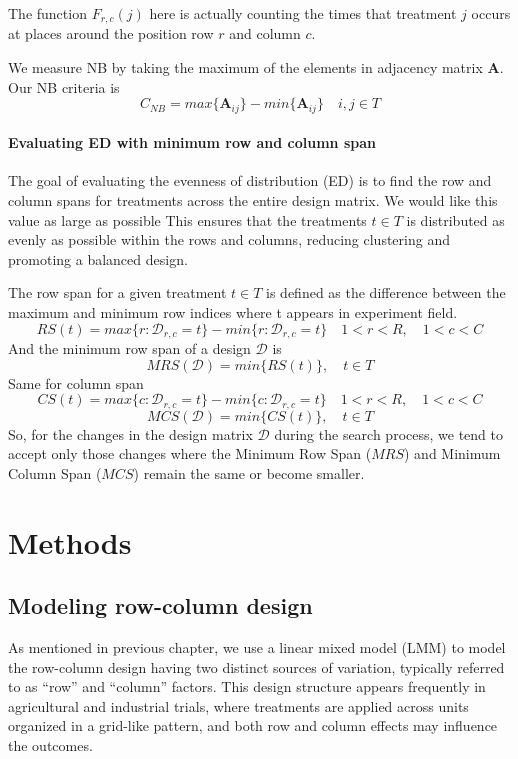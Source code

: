 \documentclass[
  a4paper,
  oneside,
  openany,
  12pt,
  onecolumn]{book}
\theoremstyle{plain}
\theoremstyle{definition}
\theoremstyle{remark}
\begin{document}
The function \(F_{r,c}(j)\) here is actually counting the times that
treatment \(j\) occurs at places around the position row \(r\) and
column \(c\).

We measure NB by taking the maximum of the elements in adjacency matrix
\(\boldsymbol{A}\). Our NB criteria is \[
C_{NB}=max\{\boldsymbol{A}_{ij}\}-min\{\boldsymbol{A}_{ij}\}  \quad i,j\in T
\]

\subsubsection{Evaluating ED with minimum row and column
span}\label{evaluating-ed-with-minimum-row-and-column-span}

The goal of evaluating the evenness of distribution (ED) is to find the
row and column spans for treatments across the entire design matrix. We
would like this value as large as possible This ensures that the
treatments \(t\in T\) is distributed as evenly as possible within the
rows and columns, reducing clustering and promoting a balanced design.

The row span for a given treatment \(t \in T\) is defined as the
difference between the maximum and minimum row indices where t appears
in experiment field. \[
RS(t)=max\{r:\mathcal{D}_{r,c}=t\}-min\{r:\mathcal{D}_{r,c}=t\} \quad 1<r<R,\quad 1<c<C
\] And the minimum row span of a design \(\mathcal{D}\) is \[
MRS(\mathcal{D})=min\{RS(t)\},\quad t \in T
\] Same for column span \[
CS(t)=max\{c:\mathcal{D}_{r,c}=t\}-min\{c:\mathcal{D}_{r,c}=t\} \quad 1<r<R,\quad 1<c<C
\] \[
MCS(\mathcal{D})=min\{CS(t)\},\quad t \in T
\] So, for the changes in the design matrix \(\mathcal{D}\) during the
search process, we tend to accept only those changes where the Minimum
Row Span (\(MRS\)) and Minimum Column Span (\(MCS\)) remain the same or
become smaller.


\chapter{Methods}\label{sec-methods}

\section{Modeling row-column design}\label{modeling-row-column-design}

As mentioned in previous chapter, we use a linear mixed model (LMM) to
model the row-column design having two distinct sources of variation,
typically referred to as ``row'' and ``column'' factors. This design
structure appears frequently in agricultural and industrial trials,
where treatments are applied across units organized in a grid-like
pattern, and both row and column effects may influence the outcomes.
\end{document}
